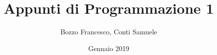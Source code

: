 \documentclass[a4paper,12pt]{book}
\begin{document}
\author{Bozzo Francesco, Conti Samuele}
\title{Appunti di Programmazione 1}
\date{Gennaio 2019}

\frontmatter
\maketitle
\tableofcontents

\mainmatter















\backmatter
\end{document}
